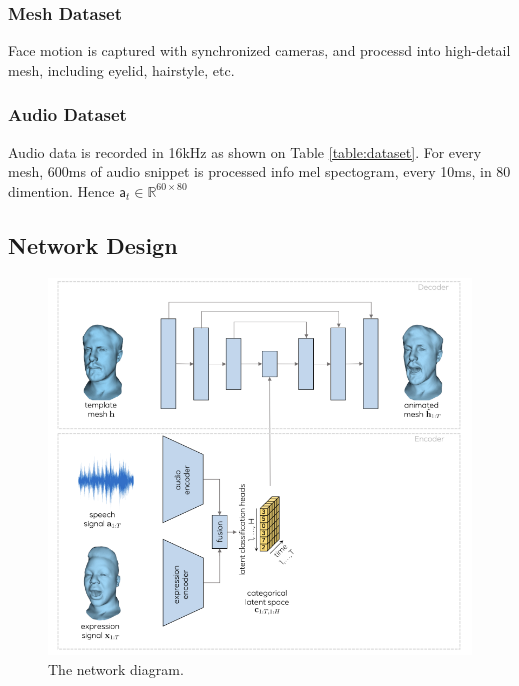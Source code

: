 \documentclass[10pt,twocolumn,letterpaper]{article}
\begin{document}
      \subsubsection*{Mesh Dataset}
      Face motion is captured with synchronized cameras, and processd into high-detail mesh, including eyelid, hairstyle, etc.
      \subsubsection*{Audio Dataset}
      Audio data is recorded in 16kHz as shown on Table \ref{table:dataset}.
      For every mesh, 600ms of audio snippet is processed info mel spectogram, every 10ms, in 80 dimention. Hence \(\mathsf{a}_t \in \mathbb{R}^{60 \times 80}\)      

      
    \subsection{Network Design}


    \begin{figure}[t]
      \begin{center}
      \includegraphics[width=0.8\linewidth]{meshtalk_overview.png}
      \end{center}
      \caption{The network diagram\cite{richard2021meshtalk}.}
      \label{fig:long}
      \label{fig:networkdiag}
    \end{figure}
\end{document}

